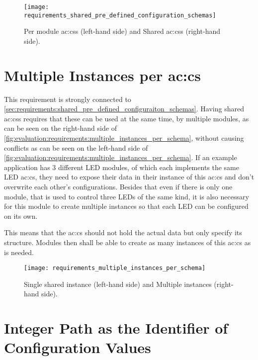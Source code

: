 \begin{figure}[H]
    \centering
    \texttt{[image: requirements\_shared\_pre\_defined\_configuration\_schemas]}
    \caption{Per module \glspl{ac:cs} (left-hand side) and Shared \glspl{ac:cs} (right-hand side).}
    \label{fig:evaluation:requirements:shared_pre_defined_configuraiton_schemas}
\end{figure}

\section{Multiple Instances per \acrlong*{ac:cs}}
\label{sec:requirements:multiple_instances_per_schema}

This requirement is strongly connected to \autoref{sec:requirements:shared_pre_defined_configuraiton_schemas}.
Having shared \glspl{ac:cs} requires that these can be used at the same time, by multiple modules, as can be seen on the right-hand side of \autoref{fig:evaluation:requirements:multiple_instances_per_schema}, without causing conflicts as can be seen on the left-hand side of \autoref{fig:evaluation:requirements:multiple_instances_per_schema}.
If an example application has 3 different LED modules, of which each implements the same LED \gls{ac:cs}, they need to expose their data in their instance of this \gls{ac:cs} and don't overwrite each other's configurations.
Besides that even if there is only one module, that is used to control three LEDs of the same kind, it is also necessary for this module to create multiple instances so that each LED can be configured on its own.

This means that the \gls{ac:cs} should not hold the actual data but only specify its structure.
Modules then shall be able to create as many instances of this \gls{ac:cs} as is needed.

\begin{figure}[H]
    \centering
    \texttt{[image: requirements\_multiple\_instances\_per\_schema]}
    \caption{Single shared instance (left-hand side) and Multiple instances (right-hand side).}
    \label{fig:evaluation:requirements:multiple_instances_per_schema}
\end{figure}

\section{Integer Path as the Identifier of Configuration Values}
\label{sec:requirements:integer_path_as_identifier_of_configuration_values}

